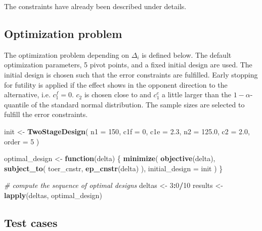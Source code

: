 \documentclass[]{book}
\newenvironment{Shaded}{\begin{snugshade}}{\end{snugshade}}
\newcommand{\CommentTok}[1]{\textcolor[rgb]{0.56,0.35,0.01}{\textit{#1}}}
\newcommand{\ControlFlowTok}[1]{\textcolor[rgb]{0.13,0.29,0.53}{\textbf{#1}}}
\newcommand{\DataTypeTok}[1]{\textcolor[rgb]{0.13,0.29,0.53}{#1}}
\newcommand{\DecValTok}[1]{\textcolor[rgb]{0.00,0.00,0.81}{#1}}
\newcommand{\FloatTok}[1]{\textcolor[rgb]{0.00,0.00,0.81}{#1}}
\newcommand{\KeywordTok}[1]{\textcolor[rgb]{0.13,0.29,0.53}{\textbf{#1}}}
\newcommand{\NormalTok}[1]{#1}
\newcommand{\OperatorTok}[1]{\textcolor[rgb]{0.81,0.36,0.00}{\textbf{#1}}}
\newcommand{\StringTok}[1]{\textcolor[rgb]{0.31,0.60,0.02}{#1}}
\begin{document}
The constraints have already been described under details.

\hypertarget{optimization-problem}{%
\subsection{Optimization problem}\label{optimization-problem}}

The optimization problem depending on \(\Delta_i\) is defined below.
The default optimization parameters, 5 pivot points, and a fixed initial design
are used.
The initial design is chosen such that the error constraints are
fulfilled. Early stopping for futility is applied if the effect shows
in the opponent direction to the alternative, i.e. \(c_1^f=0\).
\(c_2\) is chosen close to and \(c_1^e\) a little larger than the \(1-\alpha\)-quantile
of the standard normal distribution. The sample sizes are selected
to fulfill the error constraints.

\begin{Shaded}
\begin{Highlighting}[]
\NormalTok{init <-}\StringTok{ }\KeywordTok{TwoStageDesign}\NormalTok{(}
    \DataTypeTok{n1    =} \DecValTok{150}\NormalTok{,}
    \DataTypeTok{c1f   =} \DecValTok{0}\NormalTok{,}
    \DataTypeTok{c1e   =} \FloatTok{2.3}\NormalTok{,}
    \DataTypeTok{n2    =} \FloatTok{125.0}\NormalTok{,}
    \DataTypeTok{c2    =} \FloatTok{2.0}\NormalTok{,}
    \DataTypeTok{order =} \DecValTok{5}
\NormalTok{)}

\NormalTok{optimal_design <-}\StringTok{ }\ControlFlowTok{function}\NormalTok{(delta) \{}
    \KeywordTok{minimize}\NormalTok{(}
        \KeywordTok{objective}\NormalTok{(delta),}
        \KeywordTok{subject_to}\NormalTok{(}
\NormalTok{            toer_cnstr,}
            \KeywordTok{ep_cnstr}\NormalTok{(delta)}
\NormalTok{        ),}
        \DataTypeTok{initial_design =}\NormalTok{ init}
\NormalTok{    )}
\NormalTok{\}}

\CommentTok{# compute the sequence of optimal designs}
\NormalTok{deltas  <-}\StringTok{ }\DecValTok{3}\OperatorTok{:}\DecValTok{0}\OperatorTok{/}\DecValTok{10}
\NormalTok{results <-}\StringTok{ }\KeywordTok{lapply}\NormalTok{(deltas, optimal_design)}
\end{Highlighting}
\end{Shaded}

\hypertarget{test-cases-6}{%
\subsection{Test cases}\label{test-cases-6}}
\end{document}
